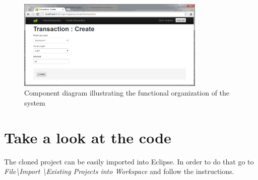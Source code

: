 \documentclass[a4paper, notitlepage]{article}
\begin{document}
\begin{figure}[H]
  \centering
    \includegraphics[width=0.8\textwidth]{new_Screen.png}
    \caption{Component diagram illustrating the functional organization of the system}
    \label{new}
\end{figure}

\section{Take a look at the code}
The cloned project can be easily imported into Eclipse. In order to do that go to \textit{File\textbackslash Import \textbackslash Existing Projects into Workspace} and follow the instructions.
\end{document}
